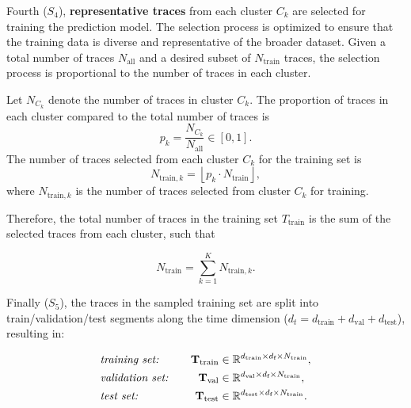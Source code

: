 Fourth ($S_4$), \textbf{representative traces} from each cluster $C_k$ are selected for training the prediction model. The selection process is optimized to ensure that the training data is diverse and representative of the broader dataset. Given a total number of traces $N_{\text{all}}$ and a desired subset of $N_{\text{train}}$ traces, the selection process is proportional to the number of traces in each cluster.

Let $N_{C_k}$ denote the number of traces in cluster $C_k$. The proportion of traces in each cluster compared to the total number of traces is
\begin{equation}
p_k = \frac{N_{C_k}}{N_{\text{all}}} \in \left[ 0, 1 \right].
\end{equation}
The number of traces selected from each cluster $C_k$ for the training set is
\begin{equation}
N_{\text{train},k} = \left\lfloor p_k \cdot N_{\text{train}} \right\rfloor,
\end{equation}
where $N_{\text{train},k}$ is the number of traces selected from cluster $C_k$ for training.

Therefore, the total number of traces in the training set $T_{\text{train}}$ is the sum of the selected traces from each cluster, such that

\begin{equation}  
N_{\text{train}} = \sum_{k=1}^{K} N_{\text{train},k}.
\end{equation}

Finally ($S_5$), the traces in the sampled training set are split into train/validation/test segments along the time dimension ($d_t = d_{\text{train}} + d_{\text{val}} + d_{\text{test}}$), resulting in:

\begin{equation}
\begin{aligned}
&\text{\textit{training set:}} \quad  & \mathbf{T}_{\text{train}} &\in \mathbb{R}^{d_{\text{train}} \times d_{\text{f}} \times N_{\text{train}}}, \\
&\text{\textit{validation set:}} \quad & \mathbf{T}_{\text{val}} &\in \mathbb{R}^{d_{\text{val}} \times d_{\text{f}} \times N_{\text{train}}}, \\
&\text{\textit{test set:}} \quad & \mathbf{T}_{\text{test}} &\in \mathbb{R}^{d_{\text{test}} \times d_{\text{f}} \times N_{\text{train}}}.
\end{aligned} 
\end{equation}

